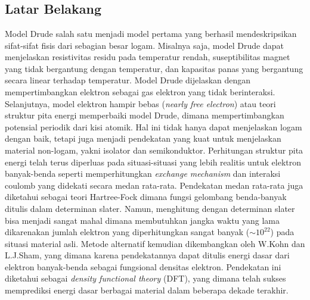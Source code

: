 \chapter{\babSatu}

\section{Latar Belakang}
Model Drude \cite{drude} salah satu menjadi model pertama yang berhasil mendeskripsikan sifat-sifat fisis dari sebagian besar logam. Misalnya saja, model Drude dapat menjelaskan resistivitas residu pada temperatur rendah, suseptibilitas magnet yang tidak bergantung dengan temperatur, dan kapasitas panas yang bergantung  secara linear terhadap temperatur. Model Drude dijelaskan dengan mempertimbangkan elektron sebagai gas elektron yang tidak berinteraksi. Selanjutnya, model elektron hampir bebas (\textit{nearly free electron}) atau teori struktur pita energi\cite{ashcroft-mermin} memperbaiki model Drude, dimana mempertimbangkan potensial periodik dari kisi atomik. Hal ini tidak hanya dapat menjelaskan logam dengan baik, tetapi juga menjadi pendekatan yang kuat untuk menjelaskan material non-logam, yakni isolator dan semikonduktor. Perhitungan struktur pita energi telah terus diperluas pada situasi-situasi yang lebih realitis untuk elektron banyak-benda seperti memperhitungkan \textit{exchange mechanism} dan interaksi coulomb yang didekati secara medan rata-rata. Pendekatan medan rata-rata juga diketahui sebagai teori Hartree-Fock dimana fungsi gelombang benda-banyak ditulis dalam determinan slater. Namun, menghitung dengan determinan slater bisa menjadi sangat mahal dimana membutuhkan jangka waktu yang lama dikarenakan jumlah elektron yang diperhitungkan sangat banyak ($\sim 10^{22}$) pada situasi material asli. Metode alternatif kemudian dikembangkan oleh W.Kohn dan L.J.Sham\cite{kohn-sham}, yang dimana karena pendekatannya dapat ditulis energi dasar dari elektron banyak-benda sebagai fungsional densitas elektron. Pendekatan ini diketahui sebagai \textit{density functional theory} (DFT), yang dimana telah sukses memprediksi energi dasar berbagai material dalam beberapa dekade terakhir.

